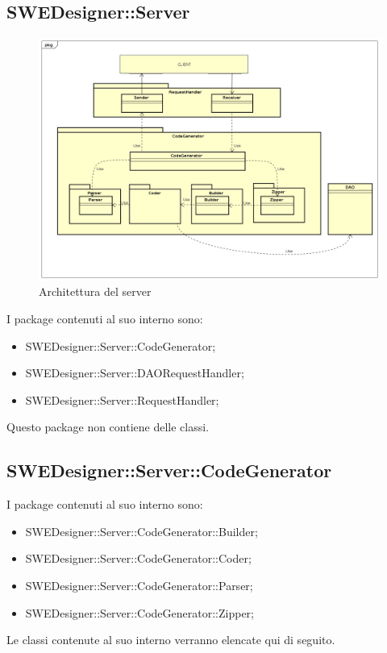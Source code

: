 \documentclass[../PianoDiQualifica.tex]{subfiles}
\begin{document}
		\subsection{SWEDesigner::Server}
			\begin{figure}[H]\label{fig:ServerSubsystem}
				\centering
				\includegraphics[scale=0.4]{Immagini/DiagrammaArchitettura/ServerSubsystem.png}
				\caption{Architettura del server}
			\end{figure}
		I package contenuti al suo interno sono:
		\begin{itemize}
			\item SWEDesigner::Server::CodeGenerator;
			\item SWEDesigner::Server::DAORequestHandler;
			\item SWEDesigner::Server::RequestHandler;
		\end{itemize}
		Questo package non contiene delle classi.
		\subsection{SWEDesigner::Server::CodeGenerator}
		I package contenuti al suo interno sono:
		\begin{itemize}
			\item SWEDesigner::Server::CodeGenerator::Builder;
			\item SWEDesigner::Server::CodeGenerator::Coder;
			\item SWEDesigner::Server::CodeGenerator::Parser;
			\item SWEDesigner::Server::CodeGenerator::Zipper;
		\end{itemize}
		Le classi contenute al suo interno verranno elencate qui di seguito.
\end{document}
